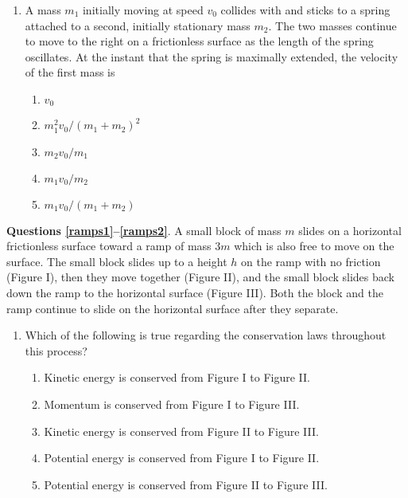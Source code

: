 \documentclass{../../../oss-apphys}
\begin{document}
\begin{multicols}{2}
\begin{enumerate}[resume,leftmargin=18pt]
  \item A mass $m_1$ initially moving at speed $v_0$ collides with and sticks
    to a spring attached to a second, initially stationary mass $m_2$. The two
    masses continue to move to the right on a frictionless surface as the
    length of the spring oscillates. At the instant that the spring is
    maximally extended, the velocity of the first mass is
    \begin{center}
    \end{center}
    \begin{enumerate}[nosep,leftmargin=18pt,label=(\Alph*)]
    \item $v_0$
    \item $m_1^2v_0/(m_1+m_2)^2$
    \item $m_2v_0/m_1$
    \item $m_1v_0/m_2$
    \item $m_1v_0/(m_1+m_2)$
    \end{enumerate}
  \end{enumerate}
  \columnbreak
  
  \textbf{Questions \ref{ramps1}--\ref{ramps2}}. A small block of mass $m$
  slides on a horizontal frictionless surface toward a ramp of mass $3m$ which
  is also free to move on the surface. The small block slides up to a height
  $h$ on the ramp with no friction (Figure I), then they move together (Figure
  II), and the small block slides back down the ramp to the horizontal surface
  (Figure III). Both the block and the ramp continue to slide on the horizontal
  surface after they separate.
  \begin{center}
  \end{center}
  \begin{enumerate}[resume,leftmargin=18pt]  
  \item Which of the following is true regarding the conservation laws
    throughout this process?
    \label{ramps1}
    \begin{enumerate}[nosep,leftmargin=18pt,label=(\Alph*)]
    \item Kinetic energy is conserved from Figure I to Figure II.
    \item Momentum is conserved from Figure I to Figure III.
    \item Kinetic energy is conserved from Figure II to Figure III.
    \item Potential energy is conserved from Figure I to Figure II.
    \item Potential energy is conserved from Figure II to Figure III.
    \end{enumerate}
    \vspace{.8in}
    

\end{enumerate}
\end{multicols}
\end{document}
